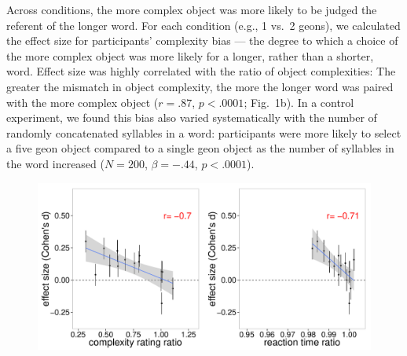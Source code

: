 \documentclass[12pt]{article}
\begin{document}
Across conditions, the more complex object was more likely to be judged the referent of the longer word. For each condition (e.g., 1 vs.\ 2 geons), we calculated the effect size for participants' complexity bias --- the degree to which a choice of the more complex object was more likely for a longer, rather than a shorter, word.  Effect size was highly correlated with the ratio of object complexities: The greater the mismatch in object complexity, the more the longer word was paired with the more complex object ($r = .87$, $p < .0001$; Fig.\ 1b). In a control experiment, we found this bias also varied systematically with the number of randomly concatenated syllables in a word: participants were more likely to select a five geon object compared to a single geon object as the number of syllables in the word increased ($N=200$, $\beta=-.44$, $p <.0001$).
					
\begin{figure}[t]
\begin{center}
\includegraphics[scale = .5]{figs/realobjs.pdf}
\caption{}%
\end{center}
\label{fig:real_objs}
\end{figure}
\end{document}
